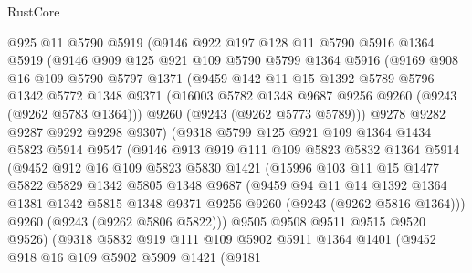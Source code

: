 \begin{lexlean}{RustCore}
\begin{coremodule}
      @925
      @11
      @5790
      @5919
      (@9146
        @922
        @197
        @128
        @11
        @5790
        @5916
        @1364
        @5919
        (@9146
          @909
          @125
          @921
          @109
          @5790
          @5799
          @1364
          @5916
          (@9169
            @908
            @16
            @109
            @5790
            @5797
            @1371
            (@9459
              @142
              @11
              @15
              @1392
              @5789
              @5796
              @1342
              @5772
              @1348
              @9371
              (@16003 @5782 @1348 @9687 @9256 @9260 (@9243 (@9262 @5783 @1364)))
              @9260
              (@9243 (@9262 @5773 @5789)))
            @9278
            @9282
            @9287
            @9292
            @9298
            @9307)
          (@9318
            @5799
            @125
            @921
            @109
            @1364
            @1434
            @5823
            @5914
            @9547
            (@9146
              @913
              @919
              @111
              @109
              @5823
              @5832
              @1364
              @5914
              (@9452
                @912
                @16
                @109
                @5823
                @5830
                @1421
                (@15996
                  @103
                  @11
                  @15
                  @1477
                  @5822
                  @5829
                  @1342
                  @5805
                  @1348
                  @9687
                  (@9459
                    @94
                    @11
                    @14
                    @1392
                    @1364
                    @1381
                    @1342
                    @5815
                    @1348
                    @9371
                    @9256
                    @9260
                    (@9243 (@9262 @5816 @1364)))
                  @9260
                  (@9243 (@9262 @5806 @5822)))
                @9505
                @9508
                @9511
                @9515
                @9520
                @9526)
              (@9318
                @5832
                @919
                @111
                @109
                @5902
                @5911
                @1364
                @1401
                (@9452
                  @918
                  @16
                  @109
                  @5902
                  @5909
                  @1421
                  (@9181

\end{coremodule}
\end{lexlean}
